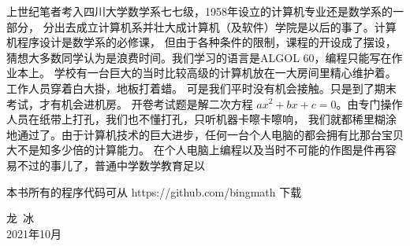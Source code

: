 \documentclass[main.tex]{subfiles}
\begin{document}
上世纪笔者考入四川大学数学系七七级，1958年设立的计算机专业还是数学系的一部分，
分出去成立计算机系并壮大成计算机（及软件）学院是以后的事了。计算机程序设计是数学系的必修课，
但由于各种条件的限制，课程的开设成了摆设，猜想大多数同学认为是浪费时间。我们学习的语言是ALGOL 60，编程只能写在作业本上。
学校有一台巨大的当时比较高级的计算机放在一大房间里精心维护着。工作人员穿着白大掛，地板打着蜡。
可是我们平时没有机会接触。只是到了期末考试，才有机会进机房。
开卷考试题是解二次方程 $ax^2+bx+c = 0$。由专门操作人员在纸带上打孔，我们也不懂打孔，只听机器卡嚓卡嚓响，
我们就都稀里糊涂地通过了。由于计算机技术的巨大进步，任何一台个人电脑的都会拥有比那台宝贝大不是知多少倍的计算能力。
在个人电脑上编程以及当时不可能的作图是件再容易不过的事儿了，普通中学数学教育足以


本书所有的程序代码可从 https://github.com/bingmath 下载


\begin{flushright}
{\kaishu 龙\,  冰}\,\,\\
2021年10月
\end{flushright}
\end{document}
